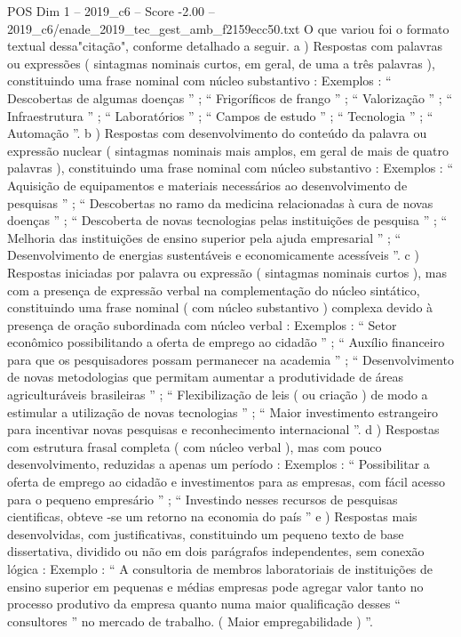\begin{textsample}{POS Dim 1 – 2019\_c6 – Score -2.00 – 2019\_c6/enade\_2019\_tec\_gest\_amb\_f2159ecc50.txt}
O que variou foi o formato textual dessa"citação", conforme detalhado a seguir. a ) Respostas com palavras ou expressões ( sintagmas nominais curtos, em geral, de uma a três palavras ), constituindo uma frase nominal com núcleo substantivo : Exemplos : “ Descobertas de algumas doenças ” ; “ Frigoríficos de frango ” ; “ Valorização ” ; “ Infraestrutura ” ; “ Laboratórios ” ; “ Campos de estudo ” ; “ Tecnologia ” ; “ Automação ”. b ) Respostas com desenvolvimento do conteúdo da palavra ou expressão nuclear ( sintagmas nominais mais amplos, em geral de mais de quatro palavras ), constituindo uma frase nominal com núcleo substantivo : Exemplos : “ Aquisição de equipamentos e materiais necessários ao desenvolvimento de pesquisas ” ; “ Descobertas no ramo da medicina relacionadas à cura de novas doenças ” ; “ Descoberta de novas tecnologias pelas instituições de pesquisa ” ; “ Melhoria das instituições de ensino superior pela ajuda empresarial ” ; “ Desenvolvimento de energias sustentáveis e economicamente acessíveis ”. c ) Respostas iniciadas por palavra ou expressão ( sintagmas nominais curtos ), mas com a presença de expressão verbal na complementação do núcleo sintático, constituindo uma frase nominal ( com núcleo substantivo ) complexa devido à presença de oração subordinada com núcleo verbal : Exemplos : “ Setor econômico possibilitando a oferta de emprego ao cidadão ” ; “ Auxílio financeiro para que os pesquisadores possam permanecer na academia ” ; “ Desenvolvimento de novas metodologias que permitam aumentar a produtividade de áreas agriculturáveis brasileiras ” ; “ Flexibilização de leis ( ou criação ) de modo a estimular a utilização de novas tecnologias ” ; “ Maior investimento estrangeiro para incentivar novas pesquisas e reconhecimento internacional ”. d ) Respostas com estrutura frasal completa ( com núcleo verbal ), mas com pouco desenvolvimento, reduzidas a apenas um período : Exemplos : “ Possibilitar a oferta de emprego ao cidadão e investimentos para as empresas, com fácil acesso para o pequeno empresário ” ; “ Investindo nesses recursos de pesquisas cientificas, obteve -se um retorno na economia do país ” e ) Respostas mais desenvolvidas, com justificativas, constituindo um pequeno texto de base dissertativa, dividido ou não em dois parágrafos independentes, sem conexão lógica : Exemplo : “ A consultoria de membros laboratoriais de instituições de ensino superior em pequenas e médias empresas pode agregar valor tanto no processo produtivo da empresa quanto numa maior qualificação desses “ consultores ” no mercado de trabalho. ( Maior empregabilidade ) ”.

\end{textsample}
